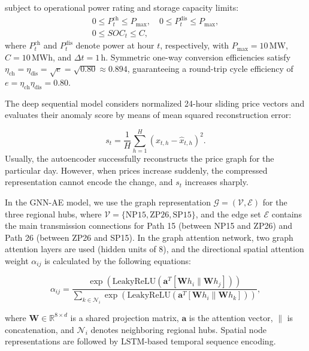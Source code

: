 \documentclass[journal]{IEEEtran}
\begin{document}
subject to operational power rating and storage capacity limits:
\begin{align}
0 \le P_t^{\text{ch}} \le P_{\max}, \quad 0 \le P_t^{\text{dis}} \le P_{\max}, \label{eq:p_limits} \\
0 \le SOC_t \le C, \label{eq:soc_limits}
\end{align}
where $P_t^{\text{ch}}$ and $P_t^{\text{dis}}$ denote power at hour $t$, respectively, with $P_{\max} = 10$\,MW, $C = 10$\,MWh, and $\Delta t = 1$\,h. Symmetric one-way conversion efficiencies satisfy $\eta_{\text{ch}} = \eta_{\text{dis}} = \sqrt{e} = \sqrt{0.80} \approx 0.894$, guaranteeing a round-trip cycle efficiency of $e = \eta_{\text{ch}}\eta_{\text{dis}} = 0.80$.

The deep sequential model considers normalized 24-hour sliding price vectors and evaluates their anomaly score by means of mean squared reconstruction error:

\begin{equation}
s_t = \frac{1}{H}\sum_{h=1}^{H}\left(x_{t,h}-\hat{x}_{t,h}\right)^2.
\label{eq:score}
\end{equation}
Usually, the autoencoder successfully reconstructs the price graph for the particular day. However, when prices increase suddenly, the compressed representation cannot encode the change, and $s_t$ increases sharply.

In the GNN-AE model, we use the graph representation $\mathcal{G} = (\mathcal{V}, \mathcal{E})$ for the three regional hubs, where $\mathcal{V} = \{\text{NP15}, \text{ZP26}, \text{SP15}\}$, and the edge set $\mathcal{E}$ contains the main transmission connections for Path 15 (between NP15 and ZP26) and Path 26 (between ZP26 and SP15). In the graph attention network, two graph attention layers are used (hidden units of 8), and the directional spatial attention weight $\alpha_{ij}$ is calculated by the following equations:

\begin{equation}
    \alpha_{ij} = \frac{\exp\left(\text{LeakyReLU}\left(\mathbf{a}^T [\mathbf{W} h_i \parallel \mathbf{W} h_j]\right)\right)}{\sum_{k \in \mathcal{N}_i} \exp\left(\text{LeakyReLU}\left(\mathbf{a}^T [\mathbf{W} h_i \parallel \mathbf{W} h_k]\right)\right)},
    \label{eq:gat}
    \end{equation}

where $\mathbf{W} \in \mathbb{R}^{8 \times d}$ is a shared projection matrix, $\mathbf{a}$ is the attention vector, $\parallel$ is concatenation, and $\mathcal{N}_i$ denotes neighboring regional hubs. Spatial node representations are followed by LSTM-based temporal sequence encoding.
\end{document}
